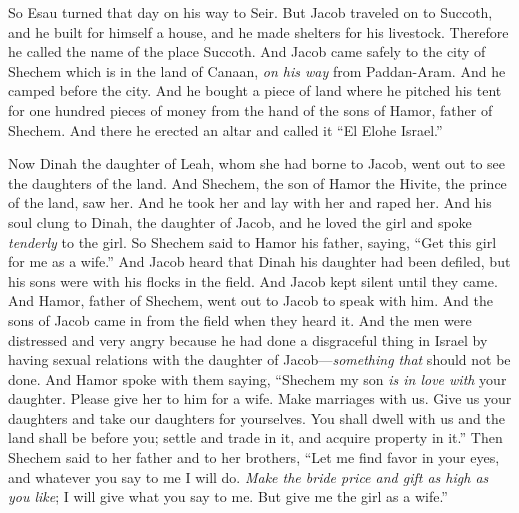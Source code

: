 \begin{biblechapter}
\verse So Esau turned that day on his way to Seir.
\verse But Jacob traveled on to Succoth, and he built for himself a house, and he made shelters for his livestock. Therefore he called the name of the place Succoth.
\verse And Jacob came safely to the city of Shechem which is in the land of Canaan, \textit{on his way} from Paddan-Aram. And he camped before the city.
\verse And he bought a piece of land where he pitched his tent for one hundred pieces of money from the hand of the sons of Hamor, father of Shechem.
\verse And there he erected an altar and called it “El Elohe Israel.”
\end{biblechapter}

\begin{biblechapter} %
 Now Dinah the daughter of Leah, whom she had borne to Jacob, went out to see the daughters of the land.
\verse And Shechem, the son of Hamor the Hivite, the prince of the land, saw her. And he took her and lay with her and raped her.
\verse And his soul clung to Dinah, the daughter of Jacob, and he loved the girl and spoke \textit{tenderly} to the girl.
\verse So Shechem said to Hamor his father, saying, “Get this girl for me as a wife.”
\verse And Jacob heard that Dinah his daughter had been defiled, but his sons were with his flocks in the field. And Jacob kept silent until they came.
\verse And Hamor, father of Shechem, went out to Jacob to speak with him.
\verse And the sons of Jacob came in from the field when they heard it. And the men were distressed and very angry because he had done a disgraceful thing in Israel by having sexual relations with the daughter of Jacob—\textit{something that} should not be done.
\verse And Hamor spoke with them saying, “Shechem my son \textit{is in love with} your daughter. Please give her to him for a wife.
\verse Make marriages with us. Give us your daughters and take our daughters for yourselves.
\verse You shall dwell with us and the land shall be before you; settle and trade in it, and acquire property in it.”
\verse Then Shechem said to her father and to her brothers, “Let me find favor in your eyes, and whatever you say to me I will do.
\verse \textit{Make the bride price and gift as high as you like}; I will give what you say to me. But give me the girl as a wife.”

\end{biblechapter}

